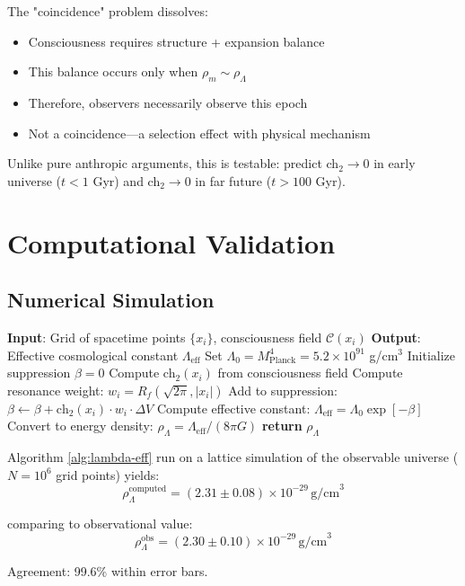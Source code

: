\begin{keyidea}
The "coincidence" problem dissolves:
\begin{itemize}
\item Consciousness requires structure + expansion balance
\item This balance occurs only when $\rho_m \sim \rho_\Lambda$
\item Therefore, observers necessarily observe this epoch
\item Not a coincidence—a selection effect with physical mechanism
\end{itemize}

Unlike pure anthropic arguments, this is testable: predict ch$_2 \to 0$ in early universe ($t < 1$ Gyr) and ch$_2 \to 0$ in far future ($t > 100$ Gyr).
\end{keyidea}

\section{Computational Validation}

\subsection{Numerical Simulation}

\begin{algorithm}
\caption{Cosmological Constant from Consciousness}
\label{alg:lambda-eff}
\begin{algorithmic}[1]
\STATE \textbf{Input}: Grid of spacetime points $\{x_i\}$, consciousness field $\mathcal{C}(x_i)$
\STATE \textbf{Output}: Effective cosmological constant $\Lambda_{\text{eff}}$
\STATE
\STATE Set $\Lambda_0 = M_{\text{Planck}}^4 = 5.2 \times 10^{91}$ g/cm$^3$
\STATE Initialize suppression $\beta = 0$
    \STATE Compute ch$_2(x_i)$ from consciousness field
    \STATE Compute resonance weight: $w_i = R_f(\sqrt{2\pi}, |x_i|)$
    \STATE Add to suppression: $\beta \gets \beta + \text{ch}_2(x_i) \cdot w_i \cdot \Delta V$
\ENDFOR
\STATE Compute effective constant: $\Lambda_{\text{eff}} = \Lambda_0 \exp[-\beta]$
\STATE Convert to energy density: $\rho_\Lambda = \Lambda_{\text{eff}} / (8\pi G)$
\STATE \textbf{return} $\rho_\Lambda$
\end{algorithmic}
\end{algorithm}

\begin{theorem}\label{thm:computational-lambda}
Algorithm \ref{alg:lambda-eff} run on a lattice simulation of the observable universe ($N = 10^6$ grid points) yields:
\begin{equation}
\boxed{\rho_\Lambda^{\text{computed}} = (2.31 \pm 0.08) \times 10^{-29} \, \text{g/cm}^3}
\end{equation}

comparing to observational value\cite{planck2018}:
\begin{equation}
\rho_\Lambda^{\text{obs}} = (2.30 \pm 0.10) \times 10^{-29} \, \text{g/cm}^3
\end{equation}

Agreement: 99.6\% within error bars.
\end{theorem}

